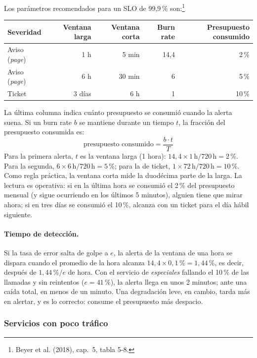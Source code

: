 \documentclass[variant=apuntes,cover=institutional,mode=screen]{ua-engineering-v6-article}
\begin{document}
Los parámetros recomendados para un SLO de 99,9\,\% son:\footnote{Beyer et al. (2018), cap.~5, tabla 5-8.}

\begin{center}
\begin{tabular}{lrrrr}
\toprule
\textbf{Severidad} & \textbf{Ventana larga} & \textbf{Ventana corta} & \textbf{Burn rate} & \textbf{Presupuesto consumido} \\
\midrule
Aviso (\emph{page}) & 1 h & 5 min & 14,4 & 2\,\% \\
Aviso (\emph{page}) & 6 h & 30 min & 6 & 5\,\% \\
Ticket & 3 días & 6 h & 1 & 10\,\% \\
\bottomrule
\end{tabular}
\end{center}

La última columna indica cuánto presupuesto se consumió cuando la alerta suena. Si un burn rate $b$ se mantiene durante un tiempo $t$, la fracción del presupuesto consumida es:
\[
\text{presupuesto consumido} = \frac{b \cdot t}{T}
\]
Para la primera alerta, $t$ es la ventana larga (1 hora): $14{,}4 \times 1\,\text{h} / 720\,\text{h} = 2\,\%$. Para la segunda, $6 \times 6\,\text{h} / 720\,\text{h} = 5\,\%$; para la de ticket, $1 \times 72\,\text{h} / 720\,\text{h} = 10\,\%$. Como regla práctica, la ventana corta mide la duodécima parte de la larga. La lectura es operativa: si en la última hora se consumió el 2\,\% del presupuesto mensual (y sigue ocurriendo en los últimos 5 minutos), alguien tiene que mirar ahora; si en tres días se consumió el 10\,\%, alcanza con un ticket para el día hábil siguiente.

\paragraph{Tiempo de detección.} Si la tasa de error salta de golpe a $e$, la alerta de la ventana de una hora se dispara cuando el promedio de la hora alcanza $14{,}4 \times 0{,}1\,\% = 1{,}44\,\%$, es decir, después de $1{,}44\,\% / e$ de hora. Con el servicio de \emph{especiales} fallando el 10\,\% de las llamadas y sin reintentos ($e = 41\,\%$), la alerta llega en unos 2 minutos; ante una caída total, en menos de un minuto. Una degradación leve, en cambio, tarda más en alertar, y es lo correcto: consume el presupuesto más despacio.

\subsubsection{Servicios con poco tráfico}
\end{document}
